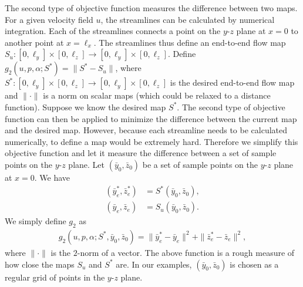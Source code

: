 \documentclass[times]{fldauth}
\begin{document}
The second type of objective function measures the difference between
two maps. For a given velocity field $u$, the streamlines can be
calculated by numerical integration. Each of the streamlines connects
a point on the $y$-$z$ plane at $x=0$ to another point at
$x=\ell_x$. The streamlines thus define an end-to-end flow map
$S_u:[0,\ell_y]\times[0,\ell_z] \to
[0,\ell_y]\times[0,\ell_z]$. Define $g_2(u,p,\alpha;S^*) = \|S^* -
S_u\|$, where $S^*: [0,\ell_y] \times [0,\ell_z] \to [0,\ell_y] \times
[0,\ell_z]$ is the desired end-to-end flow map and $\| \cdot \|$ is a
norm on scalar maps (which could be relaxed to a distance
function). Suppose we know the desired map $S^*$. The second type of
objective function can then be applied to minimize the difference
between the current map and the desired map. However, because each
streamline needs to be calculated numerically, to define a map would
be extremely hard. Therefore we simplify this objective function and
let it measure the difference between a set of sample points on the
$y$-$z$ plane. Let $(\bar{y}_0,\bar{z}_0)$ be a set of sample points
on the $y$-$z$ plane at $x=0$. We have
\begin{align*}
  (\bar{y}_e^*,\bar{z}_e^*)&= S^*(\bar{y}_0,\bar{z}_0), \\
  (\bar{y}_e,\bar{z}_e)    &= S_u(\bar{y}_0,\bar{z}_0). 
\end{align*}
We simply define $g_2$ as
\begin{eqnarray}
  \label{g2}
  g_2(u,p,\alpha;S^*,\bar{y}_0,\bar{z}_0)
  = \|\bar{y}_e^*-\bar{y}_e\|^2 + \|\bar{z}_e^*-\bar{z}_e\|^2,
\end{eqnarray}
where $\|\cdot\|$ is the $2$-norm of a vector. The above function is a
rough measure of how close the maps $S_u$ and $S^*$ are. In our
examples, $(\bar{y}_0,\bar{z}_0)$ is chosen as a regular grid of
points in the $y$-$z$ plane.

\end{document}
